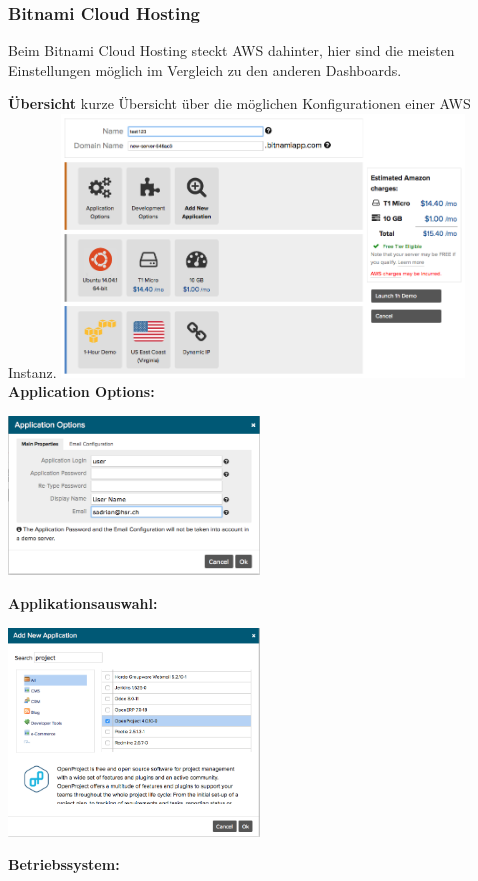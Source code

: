 \documentclass[11pt]{scrartcl}
\begin{document}
\subsubsection{Bitnami Cloud Hosting}
Beim Bitnami Cloud Hosting steckt AWS dahinter, hier sind die meisten 
Einstellungen möglich im Vergleich zu den anderen Dashboards.


\textbf{Übersicht}
kurze Übersicht über die möglichen Konfigurationen einer AWS Instanz.
\includegraphics[width=0.8\textwidth]{aws_overview}
\newpage
\textbf{Application Options:}

\includegraphics[width=0.5\textwidth]{aws_application_options}

\textbf{Applikationsauswahl:}

\includegraphics[width=0.5\textwidth]{aws_add_application}

\textbf{Betriebssystem:}
\end{document}
